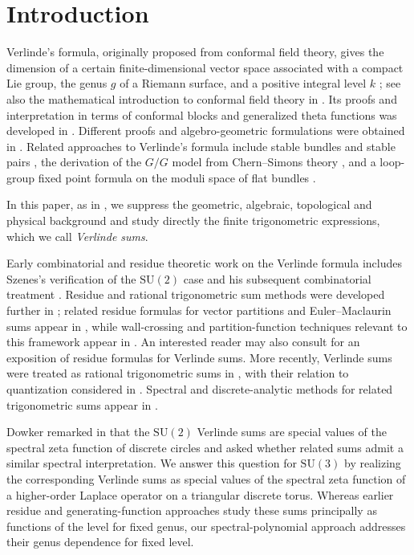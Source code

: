 \documentclass[11pt,reqno]{amsart}
\theoremstyle{remark}
\begin{document}
\section{Introduction}

Verlinde's formula, originally proposed from conformal field theory, gives the dimension of a certain finite-dimensional vector space associated with a compact Lie group, the genus $g$  of a  Riemann surface, and a positive integral level $k$ \cite{Verlinde}; see also the mathematical introduction to conformal field theory in \cite{Sc08}. Its proofs and interpretation in terms of conformal blocks and generalized theta functions was developed in \cite{BL,TUY}. Different proofs and algebro-geometric formulations were obtained in \cite{Faltings,KNR94,Beauville,Kumar}. Related approaches to Verlinde's formula include stable bundles and stable pairs \cite{Bott,Thaddeus}, the derivation of the $G/G$ model from Chern--Simons theory \cite{BT93}, and a loop-group fixed point formula on the moduli space of flat bundles \cite{AMW01}.

In this paper, as in \cite{Zagier}, we suppress the geometric, algebraic, topological and physical background and study directly the finite trigonometric expressions, which we call \emph{Verlinde sums}.

Early combinatorial and residue theoretic work on the Verlinde formula includes Szenes's verification of the $\mathrm{SU}(2)$ case and his subsequent combinatorial treatment \cite{Sz91,Sz93}. %
Residue and rational trigonometric sum methods were developed further in \cite{Sz98,Sz03}; related residue formulas for vector partitions and Euler--Maclaurin sums appear in \cite{SV03,BrVe}, while wall-crossing and partition-function techniques relevant to this framework appear in \cite{BoVe}. An interested reader may also consult \cite{Ve03} for an exposition of residue formulas for Verlinde sums.
More recently, Verlinde sums were treated as rational trigonometric sums in \cite{LM22}, with their relation to quantization considered in \cite{LM-QR}. Spectral and discrete-analytic methods for related trigonometric sums appear in \cite{Dowker92,CHJSV23a,JKS-cosecant, KM26}.

Dowker remarked in \cite[p. 2642]{Dowker92} that the $\mathrm{SU}(2)$ Verlinde sums are special values of the spectral zeta function of discrete circles and asked whether related sums admit a similar spectral interpretation. We answer this question for $\mathrm{SU}(3)$ by realizing the corresponding Verlinde sums as special values of the spectral zeta function of a higher-order Laplace operator on a triangular discrete torus. Whereas earlier residue and generating-function approaches \cite{Sz93, Zagier} study these sums principally as functions of the level for fixed genus, our spectral-polynomial approach addresses their genus dependence for fixed level.
\end{document}
